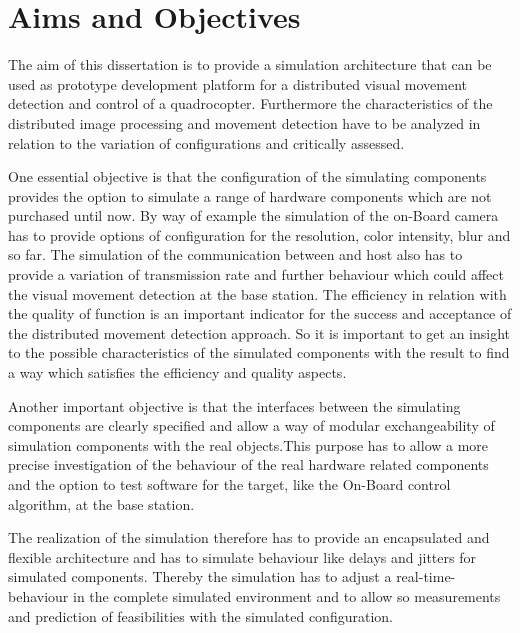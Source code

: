 \chapter{Aims and Objectives}

The aim of this dissertation is to provide a simulation architecture that can be
used as prototype development platform for a distributed visual movement
detection and control of a quadrocopter. Furthermore the characteristics of the
distributed image processing and movement detection have to be analyzed in
relation to the variation of configurations and critically assessed.

One essential objective is that the configuration of the simulating components
provides the option to simulate a range of hardware components which are not
purchased until now. By way of example the simulation of the on-Board camera has
to provide options of configuration for the resolution, color intensity, blur and
so far. The simulation of the communication between \UAV and host also has to
provide a variation of transmission rate and further behaviour which could affect
the visual movement detection at the base station. The efficiency in relation
with the quality of function is an important indicator for the success and acceptance of
the distributed movement detection approach. So it is important to get an insight
to the possible characteristics of the simulated components with the result to
find a way which satisfies the efficiency and quality aspects.

Another important objective is that the interfaces between the simulating
components are clearly specified and allow a way of modular exchangeability of
simulation components with the real objects.\newpage This purpose has to allow a
more precise investigation of the behaviour of the real hardware related components
and the option to test software for the \UAV target, like the On-Board control
algorithm, at the base station.

The realization of the simulation therefore has to provide an encapsulated and
flexible architecture and has to simulate behaviour like delays and jitters for
simulated components. Thereby the simulation has to adjust a real-time-behaviour
in the complete simulated environment and to allow so measurements and prediction
of feasibilities with the simulated configuration.
